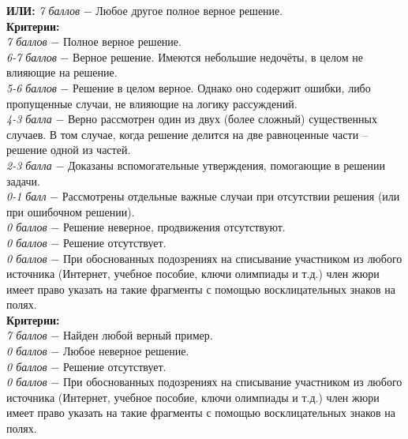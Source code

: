 \textbf{ИЛИ:}
\textit{7 баллов} $-$ Любое другое полное верное решение.\\


 \textbf{Критерии:} \\
\textit{7 баллов} $-$ Полное верное решение.\\
\textit{6-7 баллов} $-$ Верное решение. Имеются небольшие недочёты, в целом не влияющие на решение.\\
\textit{5-6 баллов} $-$ Решение в целом верное. Однако оно содержит ошибки, либо пропущенные случаи, не влияющие на логику рассуждений.\\
\textit{4-3 балла} $-$ Верно рассмотрен один из двух (более сложный) существенных случаев. В том случае, когда решение делится на две равноценные части – решение одной из частей. 
\\
\textit{2-3 балла} $-$ Доказаны вспомогательные утверждения, помогающие в решении задачи.
\\
\textit{0-1 балл} $-$ Рассмотрены отдельные важные случаи при отсутствии решения (или при ошибочном решении).
\\
\textit{0 баллов} $-$ Решение неверное, продвижения отсутствуют.\\
\textit{0 баллов} $-$ Решение отсутствует.
\\
\textit{0 баллов} $-$ При обоснованных подозрениях на списывание участником из любого источника (Интернет, учебное пособие, ключи олимпиады и т.д.) член жюри имеет право указать на такие фрагменты с помощью восклицательных знаков на полях. \\

 \textbf{Критерии:} \\
\textit{7 баллов} $-$ Найден любой верный пример.\\
\textit{0 баллов} $-$ Любое неверное решение.\\
\textit{0 баллов} $-$ Решение отсутствует.\\
\textit{0 баллов} $-$ При обоснованных подозрениях на списывание участником из любого источника (Интернет, учебное пособие, ключи олимпиады и т.д.) член жюри имеет право указать на такие фрагменты с помощью восклицательных знаков на полях. \\
